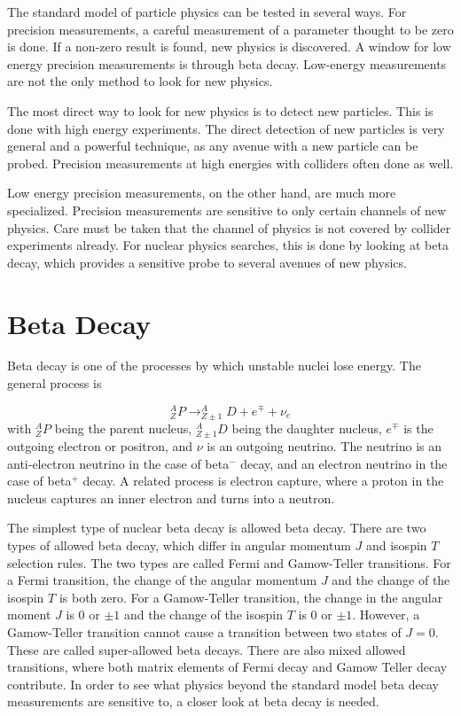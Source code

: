 \documentclass[../MaxHughesThesis.tex]{subfiles}
\begin{document}
The standard model of particle physics can be tested in several ways.
For precision measurements, a careful measurement of a parameter thought to be zero is done.
If a non-zero result is found, new physics is discovered.
A window for low energy precision measurements is through beta decay.
Low-energy measurements are not the only method to look for new physics.

The most direct way to look for new physics is to detect new particles.
This is done with high energy experiments. 
The direct detection of new particles is very general and a powerful technique, as any avenue with a new particle can be probed.
Precision measurements at high energies with colliders often done as well. 
 
Low energy precision measurements, on the other hand, are much more specialized.
Precision measurements are sensitive to only certain channels of new physics.
Care must be taken that the channel of physics is not covered by collider experiments already.
For nuclear physics searches, this is done by looking at beta decay, which provides a sensitive probe to several avenues of new physics.

\section{Beta Decay}
Beta decay is one of the processes by which unstable nuclei lose energy.
The general process is %

\begin{equation}
	\label{eq:betadecay}
	^{A}_{Z}P \rightarrow ^{A}_{Z\pm 1}D + e^{\mp} + \nu_{e}
\end{equation}
with $^{A}_{Z}P$ being the parent nucleus, $^{A}_{Z \pm 1}D$ being the daughter nucleus, $e^{\mp}$ is the outgoing electron or positron, and $\nu$ is an outgoing neutrino.
The neutrino is an anti-electron neutrino in the case of beta$^{-}$ decay, and an electron neutrino in the case of beta$^{+}$ decay. 
A related process is electron capture, where a proton in the nucleus captures an inner electron and turns into a neutron.

The simplest type of nuclear beta decay is allowed beta decay.
There are two types of allowed beta decay, which differ in angular momentum $J$ and isospin $T$ selection rules.
The two types are called Fermi and Gamow-Teller transitions. 
For a Fermi transition, the change of the angular momentum $J$ and the change of the isospin $T$ is both zero.
For a Gamow-Teller transition, the change in the angular moment $J$ is $0$ or $\pm1$ and the change of the isospin $T$ is $0$ or $\pm 1$.
However, a Gamow-Teller transition cannot cause a transition between two states of $J = 0$. 
These are called super-allowed beta decays.
There are also mixed allowed transitions, where both matrix elements of Fermi decay and Gamow Teller decay contribute.
In order to see what physics beyond the standard model beta decay measurements are sensitive to, a closer look at beta decay is needed.
\end{document}
